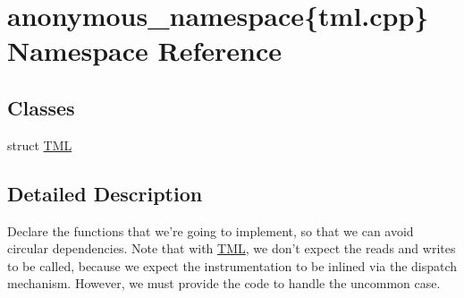 \hypertarget{namespaceanonymous__namespace_02tml_8cpp_03}{\section{anonymous\-\_\-namespace\{tml.\-cpp\} Namespace Reference}
\label{namespaceanonymous__namespace_02tml_8cpp_03}
}
\subsection*{Classes}
\begin{DoxyCompactItemize}
\item 
struct \hyperlink{structanonymous__namespace_02tml_8cpp_03_1_1TML}{T\-M\-L}
\end{DoxyCompactItemize}


\subsection{Detailed Description}
Declare the functions that we're going to implement, so that we can avoid circular dependencies. Note that with \hyperlink{structanonymous__namespace_02tml_8cpp_03_1_1TML}{T\-M\-L}, we don't expect the reads and writes to be called, because we expect the instrumentation to be inlined via the dispatch mechanism. However, we must provide the code to handle the uncommon case. 